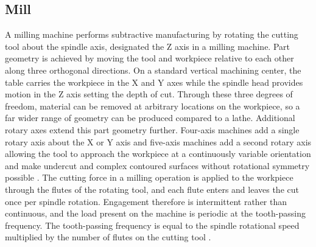 \subsection{Mill}\label{Sect:mill}
A milling machine performs subtractive manufacturing by rotating the cutting tool about the spindle axis, designated the Z axis in a milling machine. Part geometry is achieved by moving the tool and workpiece relative to each other along three orthogonal directions. On a standard vertical machining center, the table carries the workpiece in the X and Y axes while the spindle head provides motion in the Z axis setting the depth of cut. Through these three degrees of freedom, material can be removed at arbitrary locations on the workpiece, so a far wider range of geometry can be produced compared to a lathe. Additional rotary axes extend this part geometry further. Four-axis machines add a single rotary axis about the X or Y axis and five-axis machines add a second rotary axis allowing the tool to approach the workpiece at a continuously variable orientation and make undercut and complex contoured surfaces without rotational symmetry possible  \cite{altintas_manufacturing_2012}.
The cutting force in a milling operation is applied to the workpiece through the flutes of the rotating tool, and each flute enters and leaves the cut once per spindle rotation. Engagement therefore is intermittent rather than continuous, and the load present on the machine is periodic at the tooth-passing frequency. The tooth-passing frequency is equal to the spindle rotational speed multiplied by the number of flutes on the cutting tool \cite{groover_fundamentals_2010,moriwaki_multi-functional_2008,altintas_manufacturing_2012}.

